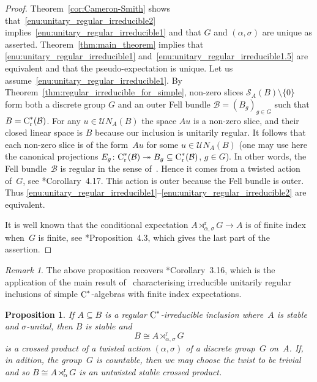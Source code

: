 \documentclass[a4paper]{amsart}
\theoremstyle{plain}
\newtheorem{proposition}[theorem]{Proposition}
\theoremstyle{definition}
\theoremstyle{remark}
\newtheorem{remark}[theorem]{Remark}
\numberwithin{theorem}{section}
\numberwithin{equation}{section}
\newcommand*{\nb}{\nobreakdash}
\newcommand*{\red}{\mathrm{r}}%
\newcommand*{\Cst}{\textup C^*}%
\newcommand*{\Slice}{\mathcal S}%
\newcommand*{\B}{\mathcal B}%
\newcommand*{\onto}{\twoheadrightarrow}
\begin{document}
\begin{proof}
  Theorem~\ref{cor:Cameron-Smith} shows
  that~\ref{enu:unitary_regular_irreducible2}
  implies~\ref{enu:unitary_regular_irreducible1} and that \(G\) and
  \((\alpha,\sigma)\) are unique as asserted.
  Theorem~\ref{thm:main_theorem} implies that
  \ref{enu:unitary_regular_irreducible1}
  and~\ref{enu:unitary_regular_irreducible1.5} are equivalent and that
  the pseudo-expectation is unique.
  Let us assume~\ref{enu:unitary_regular_irreducible1}.
  By  Theorem~\ref{thm:regular_irreducible_for_simple}, non-zero slices \(\Slice_A(B)\setminus \{0\}\) form both a discrete group \(G\) and an outer Fell bundle \(\B=(B_g)_{g\in G}\)
	such that \(B=\Cst_\red(\B)\). For any \(u\in  \mathcal{U}N_{A}(B)\)  the space \(Au\) is a non-zero slice, and their closed linear space is \(B\) because
	our inclusion is  unitarily regular. It follows that  each non-zero slice is of the
  form~\(A u\) for some \(u\in \mathcal{U}N_A(B)\) (one may use here the canonical projections \(E_g\colon \Cst_\red(\B)\onto B_g\subseteq \Cst_\red(\B)\), \(g\in G\)).
  In other words,  the Fell bundle~\(\B\) is regular in the sense of~\cite{BussExel:Regular.Fell.Bundle}. Hence it comes from a
  twisted action of~\(G\), see
  \cite{BussExel:Regular.Fell.Bundle}*{Corollary~4.17}.
  This action is outer because the Fell bundle is outer.
  Thus
  \ref{enu:unitary_regular_irreducible1}--\ref{enu:unitary_regular_irreducible2}
  are equivalent.

  It is well known that the conditional expectation
  \(A\rtimes^\red_{\alpha,\sigma} G\to A\) is of finite index
  when~\(G\) is finite, see
  \cite{Bakshi-Gupta:Regular_inclusions}*{Proposition~4.3}, which
  gives the last part of the assertion.
\end{proof}

\begin{remark}
  The above proposition recovers
  \cite{Bakshi-Gupta:Regular_inclusions}*{Corollary~3.16}, which is
  the application of the main result
  of~\cite{Bakshi-Gupta:Regular_inclusions} characterising irreducible
  unitarily regular inclusions of simple \(\Cst\)\nb-algebras with
  finite index expectations.
\end{remark}

\begin{proposition}
  \label{prop:sigma_stable}
  If \(A\subseteq B\) is a regular \(\Cst\)\nb-irreducible inclusion
  where~\(A\) is stable and \(\sigma\)-unital, then \(B\) is stable and
  \[
    B\cong A\rtimes^\red_{\alpha,\sigma}  G
  \]
  is a crossed product of a twisted action \((\alpha,\sigma)\)
  of a discrete group~\(G\) on~\(A\).
  If, in adition, the group~\(G\) is countable, then we may choose the twist to be
  trivial and so \(B\cong A\rtimes^\red_\alpha  G\) is an untwisted
  stable crossed product.
\end{proposition}
\end{document}
